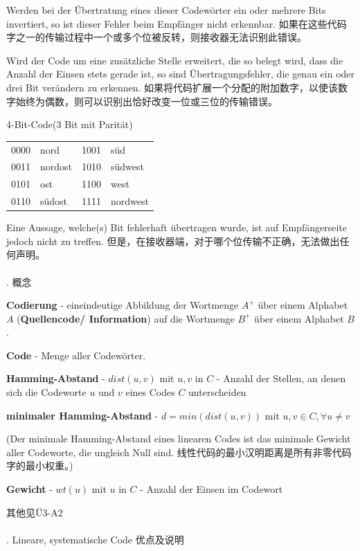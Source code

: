 \documentclass[fleqn]{article}
\begin{document}
Werden bei der Übertratung eines dieser Codewörter ein oder mehrere Bits invertiert, so ist dieser Fehler beim Empfänger nicht erkennbar.
如果在这些代码字之一的传输过程中一个或多个位被反转，则接收器无法识别此错误。

Wird der Code um eine zusätzliche Stelle erweitert, die so belegt wird, dass die Anzahl der Einsen stets gerade ist, so sind Übertragungsfehler, die genau ein oder drei Bit verändern zu erkennen.
如果将代码扩展一个分配的附加数字，以使该数字始终为偶数，则可以识别出恰好改变一位或三位的传输错误。


\begin{center}
    4-Bit-Code(3 Bit mit Parität)
    
    \begin{tabular}{l|l|l|l}
    \hline
    0000&nord&1001&süd\\
    0011&nordost&1010&südwest\\
    0101&ost&1100&west\\
    0110&südost&1111&nordwest\\
    \hline 
    \end{tabular}
\end{center}

Eine Aussage, welche(s) Bit fehlerhaft übertragen wurde, ist auf Empfängerseite jedoch nicht zu treffen.
但是，在接收器端，对于哪个位传输不正确，无法做出任何声明。
\\
\\
. 概念

\textbf{Codierung} - eineindeutige Abbildung der Wortmenge $A^+$ über einem Alphabet $A$ (\textbf{Quellencode/ Information})
 auf die Wortmenge $B^+$ über einem Alphabet $B$.

\textbf{Code} - Menge aller Codewörter.

\textbf{Hamming-Abstand} - $dist(u, v)$ mit $u,v$ in $C$ - Anzahl der Stellen, an denen sich die Codeworte $u$ und $v$ eines Codes $C$ unterscheiden

\textbf{minimaler Hamming-Abstand} - $d = min(dist(u, v)) $ mit $ u,v \in C,\forall u \neq v$

(Der minimale Hamming-Abstand eines linearen Codes ist das minimale Gewicht aller Codeworte, die ungleich Null sind. 线性代码的最小汉明距离是所有非零代码字的最小权重。)

\textbf{Gewicht} - $wt(u)$ mit $u$ in $C$ - Anzahl der Einsen im Codewort

其他见Ü3-A2
\\
\\
. Lineare, systematische Code 优点及说明
\end{document}
